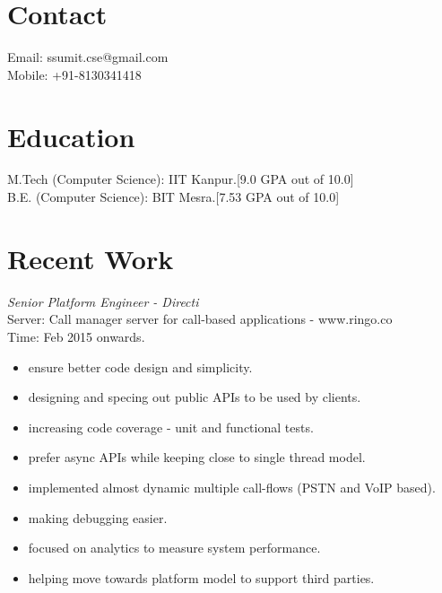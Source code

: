 \documentclass[margin,line]{resume}
\begin{document}
\begin{resume}

    \section{\mysidestyle Contact}
    	Email: ssumit.cse@gmail.com\\
    	Mobile: +91-8130341418
    \section{\mysidestyle Education}
	M.Tech (Computer Science): IIT Kanpur.[9.0 GPA out of 10.0]\\
	B.E. (Computer Science): BIT Mesra.[7.53 GPA out of 10.0]

    \section{\mysidestyle Recent Work}

\textit{Senior Platform Engineer - Directi} \\
Server: Call manager server for call-based applications - www.ringo.co\\
Time: Feb 2015 onwards.\\
\begin{itemize}
	\item ensure better code design and simplicity.
        \item designing and specing out public APIs to be used by clients.
	\item increasing code coverage - unit and functional tests.
	\item prefer async APIs while keeping close to single thread model.
	\item implemented almost dynamic multiple call-flows (PSTN and VoIP based).
	\item making debugging easier.
        \item focused on analytics to measure system performance.
        \item helping move towards platform model to support third parties.
\end{itemize}


\end{resume}
\end{document}
